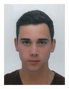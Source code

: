 \begin{minipage}{0.3\textwidth}\raggedright
	\includegraphics[width=\textwidth]{images/team/mwieland}
\end{minipage}

\clearpage


